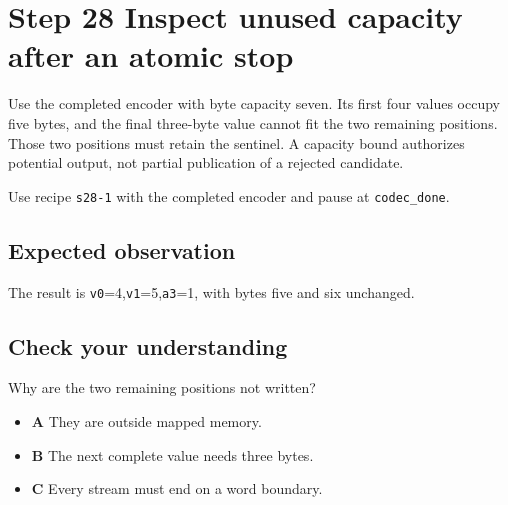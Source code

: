 \section{Step 28 Inspect unused capacity after an atomic stop}\label{delta-s28}

Use the completed encoder with byte capacity seven. Its first four values occupy five bytes, and the final three-byte value cannot fit the two remaining positions. Those two positions must retain the sentinel. A capacity bound authorizes potential output, not partial publication of a rejected candidate.

Use recipe \texttt{s28-1} with the completed encoder and pause at \texttt{codec\_done}.

\subsection{Expected observation}
The result is \texttt{v0}=4,\texttt{v1}=5,\texttt{a3}=1, with bytes five and six unchanged.

\subsection{Check your understanding}
Why are the two remaining positions not written?

\begin{itemize}
  \item \textbf{A} They are outside mapped memory.
  \item \textbf{B} The next complete value needs three bytes.
  \item \textbf{C} Every stream must end on a word boundary.
\end{itemize}
